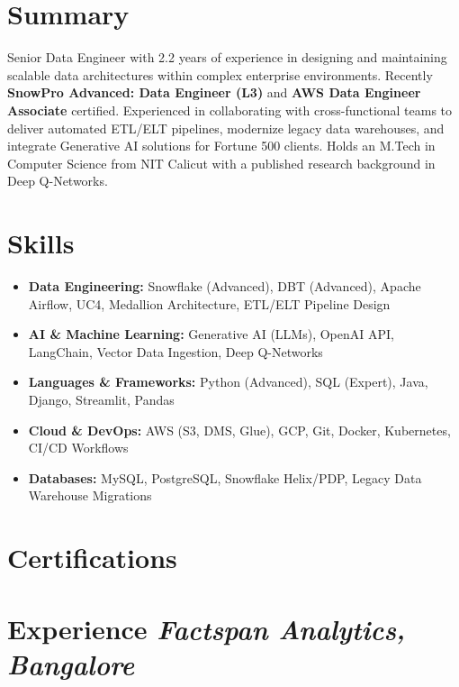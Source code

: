 


\section*{Summary}
\noindent Senior Data Engineer with 2.2 years of experience in designing and maintaining scalable data architectures within complex enterprise environments. Recently \textbf{SnowPro Advanced: Data Engineer (L3)} and \textbf{AWS Data Engineer Associate} certified. Experienced in collaborating with cross-functional teams to deliver automated ETL/ELT pipelines, modernize legacy data warehouses, and integrate Generative AI solutions for Fortune 500 clients. Holds an M.Tech in Computer Science from NIT Calicut with a published research background in Deep Q-Networks.

\section*{Skills}
\begin{itemize}[leftmargin=0.5cm, label={}]
    \item \textbf{Data Engineering:} Snowflake (Advanced), DBT (Advanced), Apache Airflow, UC4, Medallion Architecture, ETL/ELT Pipeline Design
    \item \textbf{AI \& Machine Learning:} Generative AI (LLMs), OpenAI API, LangChain, Vector Data Ingestion, Deep Q-Networks
    \item \textbf{Languages \& Frameworks:} Python (Advanced), SQL (Expert), Java, Django, Streamlit, Pandas
    \item \textbf{Cloud \& DevOps:} AWS (S3, DMS, Glue), GCP, Git, Docker, Kubernetes, CI/CD Workflows
    \item \textbf{Databases:} MySQL, PostgreSQL, Snowflake Helix/PDP, Legacy Data Warehouse Migrations
\end{itemize}

\section*{Certifications}
   

\section*{Experience \hfill \textit{Factspan Analytics, Bangalore}}


